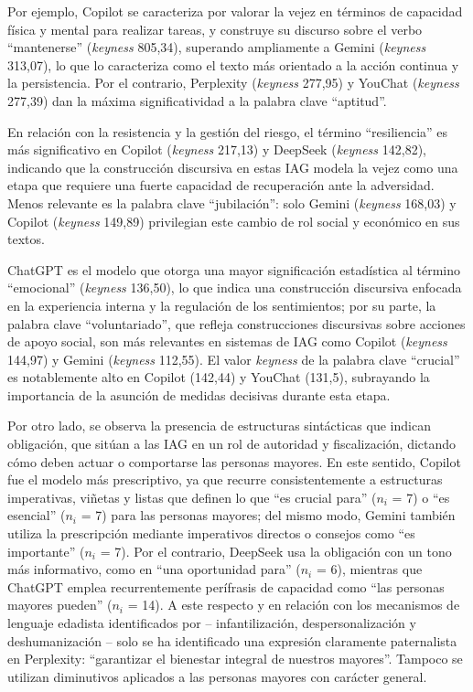 \documentclass[spanish]{textolivre}
\begin{document}
Por ejemplo, Copilot se caracteriza por valorar la vejez en términos de capacidad física y mental para realizar tareas, y construye su discurso sobre el verbo ``mantenerse'' (\textit{keyness} 805,34), superando ampliamente a Gemini (\textit{keyness} 313,07), lo que lo caracteriza como el texto más orientado a la acción continua y la persistencia. Por el contrario, Perplexity (\textit{keyness} 277,95) y YouChat (\textit{keyness} 277,39) dan la máxima significatividad a la palabra clave ``aptitud''.

En relación con la resistencia y la gestión del riesgo, el término ``resiliencia'' es más significativo en Copilot (\textit{keyness} 217,13) y DeepSeek (\textit{keyness} 142,82), indicando que la construcción discursiva en estas IAG modela la vejez como una etapa que requiere una fuerte capacidad de recuperación ante la adversidad. Menos relevante es la palabra clave ``jubilación'': solo Gemini (\textit{keyness} 168,03) y Copilot (\textit{keyness} 149,89) privilegian este cambio de rol social y económico en sus textos.

ChatGPT es el modelo que otorga una mayor significación estadística al término ``emocional'' (\textit{keyness} 136,50), lo que indica una construcción discursiva enfocada en la experiencia interna y la regulación de los sentimientos; por su parte, la palabra clave ``voluntariado'', que refleja construcciones discursivas sobre acciones de apoyo social, son más relevantes en sistemas de IAG como Copilot (\textit{keyness} 144,97) y Gemini (\textit{keyness} 112,55). El valor \textit{keyness} de la palabra clave ``crucial'' es notablemente alto en Copilot (142,44) y YouChat (131,5), subrayando la importancia de la asunción de medidas decisivas durante esta etapa.

Por otro lado, se observa la presencia de estructuras sintácticas que indican obligación, que sitúan a las IAG en un rol de autoridad y fiscalización, dictando cómo deben actuar o comportarse las personas mayores. En este sentido, Copilot fue el modelo más prescriptivo, ya que recurre consistentemente a estructuras imperativas, viñetas y listas que definen lo que ``es crucial para'' ($n_i$ = 7) o ``es esencial'' ($n_i$ = 7) para las personas mayores; del mismo modo, Gemini también utiliza la prescripción mediante imperativos directos o consejos como ``es importante'' ($n_i$ = 7). Por el contrario, DeepSeek usa la obligación con un tono más informativo, como en ``una oportunidad para'' ($n_i$ = 6), mientras que ChatGPT emplea recurrentemente perífrasis de capacidad como ``las personas mayores pueden'' ($n_i$ = 14). A este respecto y en relación con los mecanismos de lenguaje edadista identificados por \textcite{gomezcamacho2025} -- infantilización, despersonalización y deshumanización -- solo se ha identificado una expresión claramente paternalista en Perplexity: ``garantizar el bienestar integral de nuestros mayores''. Tampoco se utilizan diminutivos aplicados a las personas mayores con carácter general.
\end{document}
